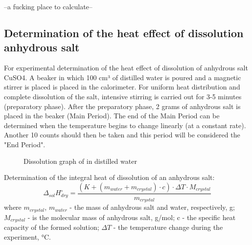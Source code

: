 \documentclass[12pt, letterpaper]{article}
\begin{document}
        --a fucking place to calculate--

        \subsection{Determination of the heat effect of dissolution
anhydrous salt }
        For experimental determination of the heat effect of dissolution of anhydrous salt CuSO4. A beaker in which 100 cm³ of distilled water is poured and a magnetic stirrer is placed is placed in the calorimeter. For uniform heat distribution and complete dissolution of the salt, intensive stirring is carried out for 3-5 minutes (preparatory phase). After the preparatory phase, 2 grams of anhydrous salt is placed in the beaker (Main Period). The end of the Main Period can be determined when the temperature begins to change linearly (at a constant rate). Another 10 counts should then be taken and this period will be considered the "End Period".
        \begin{figure}[h]
            \centering
            \caption{Dissolution graph of  in distilled water}
        \end{figure}
        Determination of the integral heat of dissolution of an anhydrous salt: 
        \begin{equation}
            \Delta_{sol}H^\circ_{dry} = \frac{(K + (m_{water} + m_{crystal}) \cdot c) \cdot \Delta T \cdot M_{crystal}}{m_{crystal}}
        \end{equation}
        where $ m_{crystal}$, $m_{water}$ - the mass of anhydrous salt and water, respectively, g; $M_{crystal}$ - is the molecular mass of anhydrous salt, g/mol; c - the specific heat capacity of the formed solution; $\Delta T$ - the temperature change during the experiment, °C. \\
\end{document}
